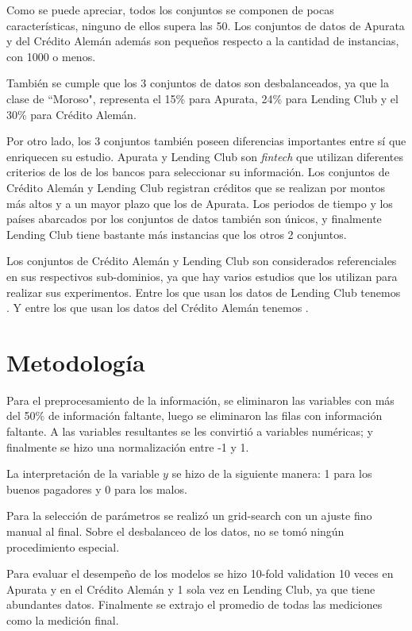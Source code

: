 Como se puede apreciar, todos los conjuntos se componen de pocas características, ninguno de ellos supera las 50. Los conjuntos de datos de Apurata y del Crédito Alemán además son pequeños respecto a la cantidad de instancias, con 1000 o menos.

También se cumple que los 3 conjuntos de datos son desbalanceados, ya que la clase de ``Moroso", representa el 15\% para Apurata, 24\% para Lending Club y el 30\% para Crédito Alemán.

Por otro lado, los 3 conjuntos también poseen diferencias importantes entre sí que enriquecen su estudio. Apurata y Lending Club son \textit{fintech} que utilizan diferentes criterios de los de los bancos para seleccionar su información. Los conjuntos de Crédito Alemán y Lending Club registran créditos que se realizan por montos más altos y a un mayor plazo que los de Apurata. Los periodos de tiempo y los países abarcados por los conjuntos de datos también son únicos, y finalmente Lending Club tiene bastante más instancias que los otros 2 conjuntos.

Los conjuntos de Crédito Alemán y Lending Club son considerados referenciales en sus respectivos sub-dominios, ya que hay varios estudios que los utilizan para realizar sus experimentos. Entre los que usan los datos de Lending Club tenemos \citep{malekipirbazari2015risk, zhang2016research, zang2014credit, tan2018deep}. Y entre los que usan los datos del Crédito Alemán tenemos \citep{harris2015credit, nanni2009experimental, brown2012experimental, wang2012two}.

\section{Metodología}

Para el preprocesamiento de la información, se eliminaron las variables con más del 50\% de información faltante, luego se eliminaron las filas con información faltante. A las variables resultantes se les convirtió a variables numéricas; y finalmente se hizo una normalización entre -1 y 1.

La interpretación de la variable $y$ se hizo de la siguiente manera: 1 para los buenos pagadores y 0 para los malos.

Para la selección de parámetros se realizó un grid-search con un ajuste fino manual al final. Sobre el desbalanceo de los datos, no se tomó ningún procedimiento especial. 

Para evaluar el desempeño de los modelos se hizo 10-fold validation 10 veces en Apurata y en el Crédito Alemán y 1 sola vez en Lending Club, ya que tiene abundantes datos. Finalmente se extrajo el promedio de todas las mediciones como la medición final. 

